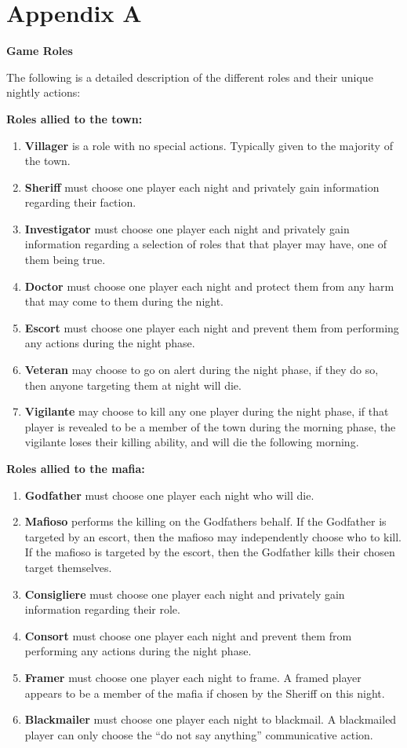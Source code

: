 \section*{Appendix A}\label{app:A}
\begin{center}
	\textbf{Game Roles}
\end{center}
The following is a detailed description of the different roles and their unique
nightly actions:

\textbf{Roles allied to the town:}
\begin{enumerate}
	\item\textbf{Villager} is a  role with no special actions. Typically given 
	to the majority of the town.
	\item\textbf{Sheriff} must choose one player each night and privately gain 
	information regarding their faction.
	\item\textbf{Investigator} must choose one player each night and privately 
	gain information regarding a selection of roles that that player may have, 
	one of them being true.
	\item\textbf{Doctor} must choose one player each night and protect them 
	from any harm that may come to them during the night.
	\item\textbf{Escort} must choose one player each night and prevent them 
	from performing any actions during the night phase.
	\item\textbf{Veteran} may choose to go on alert during the night phase, if 
	they do so, then anyone targeting them at night will die.
	\item\textbf{Vigilante} may choose to kill any one player during the night 
	phase, if that player is revealed to be a member of the town during the 
	morning phase, the vigilante loses their killing ability, and will die the 
	following morning.
\end{enumerate}
\textbf{Roles allied to the mafia:}
\begin{enumerate}
	\item\textbf{Godfather} must choose one player each night who will die.
	\item\textbf{Mafioso} performs the killing on the Godfathers behalf. If the 
	Godfather is targeted by an escort, then the mafioso may independently 
	choose who to kill. If the mafioso is targeted by the escort, then the 
	Godfather kills their chosen target themselves.
	\item\textbf{Consigliere} must choose one player each night and privately 
	gain information regarding their role.
	\item\textbf{Consort} must choose one player each night and prevent them 
	from performing any actions during the night phase.
	\item\textbf{Framer} must choose one player each night to frame. A framed 
	player appears to be a member of the mafia if chosen by the Sheriff on this 
	night.
	\item\textbf{Blackmailer} must choose one player each night to blackmail. A 
	blackmailed player can only choose the “do not say anything” communicative 
	action.
\end{enumerate}